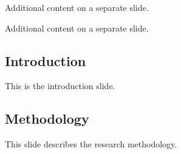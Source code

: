 \begin{frame}

Additional content on a separate slide.

\end{frame}

\begin{frame}

Additional content on a separate slide.

\end{frame}

\subsection{Introduction}\label{introduction}

This is the introduction slide.

\subsection{Methodology}\label{methodology}

This slide describes the research methodology.
